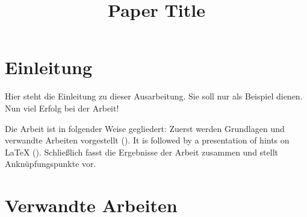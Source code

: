 \ifluatex
\fi

\title{Paper Title}

\author{ \and {}}



%
%

\maketitle

\begin{abstract}
\lipsum[1]

\end{abstract}


\section{Einleitung}
\label{sec:introduction}
Hier steht die Einleitung zu dieser Ausarbeitung.
Sie soll nur als Beispiel dienen.
Nun viel Erfolg bei der Arbeit!

Die Arbeit ist in folgender Weise gegliedert:
Zuerst werden Grundlagen und verwandte Arbeiten vorgestellt ().
It is followed by a presentation of hints on \LaTeX{} ().
Schließlich fasst  die Ergebnisse der Arbeit zusammen und stellt Anknüpfungspunkte vor.

\section{Verwandte Arbeiten}
\label{sec:relatedwork}

